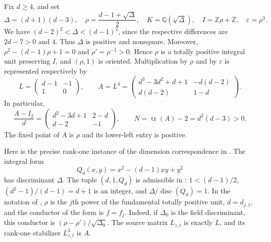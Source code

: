 \documentclass[11pt]{article}
\newcommand{\Q}{\mathbb Q}
\newcommand{\Z}{\mathbb Z}
\newcommand{\tr}{\operatorname{tr}}
\begin{document}
Fix $d\geq4$, and set
\begin{equation}
\label{eq:arithmetic}
 \Delta=(d+1)(d-3),\quad
 \rho=\frac{d-1+\sqrt\Delta}{2},\quad
 K=\Q(\sqrt\Delta),\quad I=\Z\rho+\Z,\quad
 \varepsilon=\rho^3.
\end{equation}
We have $(d-2)^2<\Delta<(d-1)^2$, since the respective differences are
$2d-7>0$ and $4$. Thus $\Delta$ is positive and nonsquare. Moreover,
$\rho^2-(d-1)\rho+1=0$ and $\rho'=\rho^{-1}>0$. Hence $\rho$ is a totally
positive integral unit preserving $I$, and $(\rho,1)$ is oriented.
Multiplication by $\rho$ and by $\varepsilon$ is represented respectively by
\begin{equation}
\label{eq:A}
 L=\begin{pmatrix}d-1&-1\\1&0\end{pmatrix},\qquad
 A=L^3=
 \begin{pmatrix}d^3-3d^2+d+1&-d(d-2)\\d(d-2)&1-d\end{pmatrix}.
\end{equation}
In particular,
\begin{equation}
\label{eq:Amod}
 \frac{A-I_2}{d}=
 \begin{pmatrix}d^2-3d+1&2-d\\d-2&-1\end{pmatrix},
 \qquad N=\tr(A)-2=d^2(d-3)>0.
\end{equation}
The fixed point of $A$ is $\rho$ and its lower-left entry is positive.

Here is the precise rank-one instance of the dimension correspondence in
\cite[Definitions~1.28--1.30 and Theorem~4.50]{AFK25}.
The integral form
\[
 Q_d(x,y)=x^2-(d-1)xy+y^2
\]
has discriminant $\Delta$. The tuple $(d,1,Q_d)$ is admissible in
\cite[Definition~1.1]{AFK26}: $1<(d-1)/2$,
$(d^2-1)/(d-1)=d+1$ is an integer, and $\Delta/\operatorname{disc}(Q_d)=1$.
In the notation of \cite{AFK25}, $\rho$ is the $j$th power of the fundamental
totally positive unit, $d=d_{j,1}$, and the conductor of the form is $f=f_j$.
Indeed, if $\Delta_0$ is the field discriminant, this conductor is
$(\rho-\rho')/\sqrt{\Delta_0}$. The source matrix $L_{z,t}$ is exactly $L$,
and its rank-one stabilizer $L_{z,t}^3$ is $A$.
\end{document}
